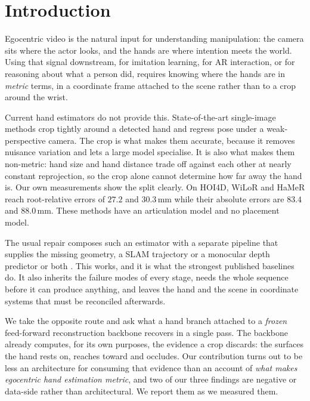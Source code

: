 \section{Introduction}
\label{sec:intro}

Egocentric video is the natural input for understanding manipulation: the camera sits where the
actor looks, and the hands are where intention meets the world. Using that signal downstream, for
imitation learning, for AR interaction, or for reasoning about what a person did, requires knowing
where the hands are in \emph{metric} terms, in a coordinate frame attached to the scene rather than
to a crop around the wrist.

Current hand estimators do not provide this. State-of-the-art single-image methods
\citep{pavlakos2024hamer, potamias2024wilor} crop tightly around a detected hand and regress pose
under a weak-perspective camera. The crop is what makes them accurate, because it removes nuisance
variation and lets a large model specialise. It is also what makes them non-metric: hand size and
hand distance trade off against each other at nearly constant reprojection, so the crop alone cannot
determine how far away the hand is. Our own measurements show the split clearly. On HOI4D, WiLoR and
HaMeR reach root-relative errors of $27.2$ and $30.3$\,mm while their absolute errors are $83.4$ and
$88.0$\,mm. These methods have an articulation model and no placement model.

The usual repair composes such an estimator with a separate pipeline that supplies the missing
geometry, a SLAM trajectory or a monocular depth predictor or both
\citep{zhang2025hawor, dynhamr}. This works, and it is what the strongest published baselines do.
It also inherits the failure modes of every stage, needs the whole sequence before it can produce
anything, and leaves the hand and the scene in coordinate systems that must be reconciled afterwards.

We take the opposite route and ask what a hand branch attached to a \emph{frozen} feed-forward
reconstruction backbone recovers in a single pass. The backbone already computes, for its own
purposes, the evidence a crop discards: the surfaces the hand rests on, reaches toward and occludes.
Our contribution turns out to be less an architecture for consuming that evidence than an account of
\emph{what makes egocentric hand estimation metric}, and two of our three findings are negative or
data-side rather than architectural. We report them as we measured them.


